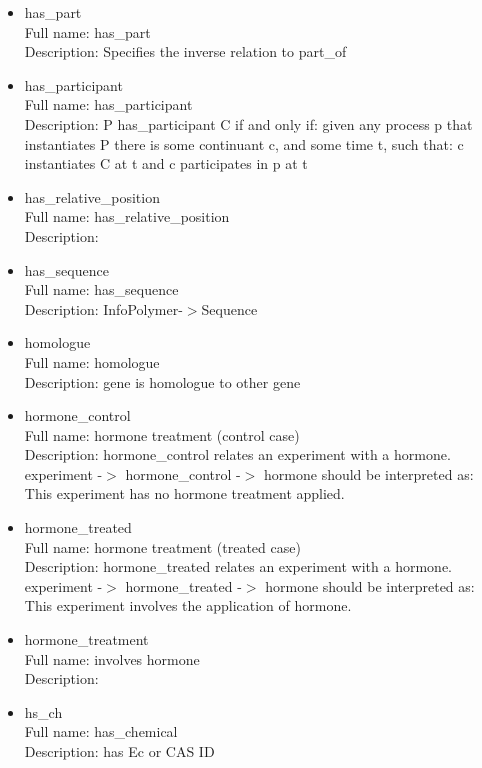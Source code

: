 \begin{itemize}
\item{has\_part}\\ Full name: has\_part\\ Description: Specifies the inverse relation to part\_of 

\item{has\_participant}\\ Full name: has\_participant\\ Description: P has\_participant C if and only if: given any process p that instantiates P there is some continuant c, and some time t, such that: c instantiates C at t and c participates in p at t 

\item{has\_relative\_position}\\ Full name: has\_relative\_position\\ Description: 

\item{has\_sequence}\\ Full name: has\_sequence\\ Description: InfoPolymer-$>$Sequence 

\item{homologue}\\ Full name: homologue\\ Description: gene is homologue to other gene 

\item{hormone\_control}\\ Full name: hormone treatment (control case)\\ Description: hormone\_control relates an experiment with a hormone. experiment -$>$ hormone\_control -$>$ hormone should be interpreted as: This experiment has no hormone treatment applied. 

\item{hormone\_treated}\\ Full name: hormone treatment (treated case)\\ Description: hormone\_treated relates an experiment with a hormone. experiment -$>$ hormone\_treated -$>$ hormone should be interpreted as: This experiment involves the application of hormone. 

\item{hormone\_treatment}\\ Full name: involves hormone\\ Description: 

\item{hs\_ch}\\ Full name: has\_chemical\\ Description: has Ec or CAS ID 


\end{itemize}
